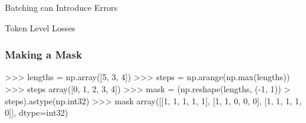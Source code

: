 \documentclass{beamer}
\begin{document}
\begin{section}{Batching can Introduce Errors}
\begin{subsection}{Token Level Losses}
\begin{frame}[fragile]
    \frametitle{Making a Mask}
    \begin{pythoncode}
        >>> lengths = np.array([5, 3, 4])
        >>> steps = np.arange(np.max(lengths))
        >>> steps
        array([0, 1, 2, 3, 4])
        >>> mask = (np.reshape(lengths, (-1, 1)) > steps).astype(np.int32)
        >>> mask
        array([[1, 1, 1, 1, 1],
               [1, 1, 0, 0, 0],
               [1, 1, 1, 1, 0]], dtype=int32)
    \end{pythoncode}
\end{frame}


\end{subsection}
\end{section}
\end{document}
